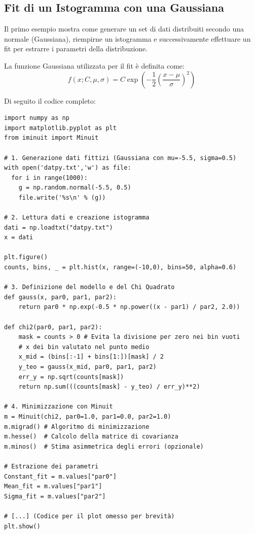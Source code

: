 \documentclass[openany,a4paper,12pt]{book}
\begin{document}
\subsection*{Fit di un Istogramma con una Gaussiana}

Il primo esempio mostra come generare un set di dati distribuiti secondo una normale (Gaussiana), riempirne un istogramma e successivamente effettuare un fit per estrarre i parametri della distribuzione. 

La funzione Gaussiana utilizzata per il fit è definita come:
\begin{equation}
    f(x; C, \mu, \sigma) = C \exp\left(-\frac{1}{2}\left(\frac{x - \mu}{\sigma}\right)^2\right)
\end{equation}

Di seguito il codice completo:

\begin{lstlisting}[caption={Generazione e fit di un istogramma Gaussiano}]
import numpy as np
import matplotlib.pyplot as plt
from iminuit import Minuit

# 1. Generazione dati fittizi (Gaussiana con mu=-5.5, sigma=0.5)
with open('datpy.txt','w') as file:
  for i in range(1000):
    g = np.random.normal(-5.5, 0.5)
    file.write('%s\n' % (g))

# 2. Lettura dati e creazione istogramma
dati = np.loadtxt("datpy.txt")
x = dati

plt.figure()
counts, bins, _ = plt.hist(x, range=(-10,0), bins=50, alpha=0.6)

# 3. Definizione del modello e del Chi Quadrato
def gauss(x, par0, par1, par2):
    return par0 * np.exp(-0.5 * np.power((x - par1) / par2, 2.0))

def chi2(par0, par1, par2):
    mask = counts > 0 # Evita la divisione per zero nei bin vuoti
    # x dei bin valutato nel punto medio
    x_mid = (bins[:-1] + bins[1:])[mask] / 2
    y_teo = gauss(x_mid, par0, par1, par2)
    err_y = np.sqrt(counts[mask])
    return np.sum(((counts[mask] - y_teo) / err_y)**2)

# 4. Minimizzazione con Minuit
m = Minuit(chi2, par0=1.0, par1=0.0, par2=1.0)
m.migrad() # Algoritmo di minimizzazione
m.hesse()  # Calcolo della matrice di covarianza
m.minos()  # Stima asimmetrica degli errori (opzionale)

# Estrazione dei parametri
Constant_fit = m.values["par0"]
Mean_fit = m.values["par1"]
Sigma_fit = m.values["par2"]

# [...] (Codice per il plot omesso per brevità)
plt.show()
\end{lstlisting}
\end{document}
